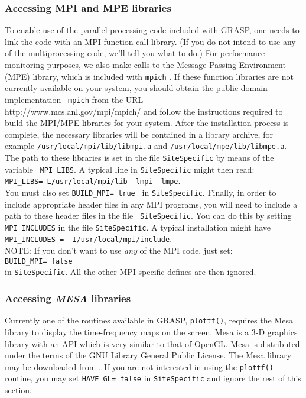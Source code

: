 \subsubsection{Accessing MPI and MPE libraries}
To enable use of the parallel processing code included with GRASP, one
needs to link the code with an MPI function call library.  (If you do not
intend to use any of the multiprocessing code, we'll tell you what to do.)
For performance monitoring purposes, we also make calls to the Message
Passing Environment (MPE) library, which is included with {\tt mpich}
\cite{MPICH}.  If these function libraries are not currently available
on your system, you should obtain the public domain implementation {\tt
mpich} from the URL\\
{http://www.mcs.anl.gov/mpi/mpich/}
and follow the instructions required
to build the MPI/MPE libraries for your system.  After the installation
process is complete, the necessary libraries will be contained in a
library archive, for example \mbox{\tt /usr/local/mpi/lib/libmpi.a} and
\mbox{\tt /usr/local/mpe/lib/libmpe.a}.  The path to these libraries
is set in the file {\tt SiteSpecific} by means of the variable {\tt
MPI\_LIBS}.  A typical line in {\tt SiteSpecific} might then read:\\
\mbox{\tt MPI\_LIBS=-L/usr/local/mpi/lib -lmpi -lmpe}.\\
You must also set {\tt BUILD\_MPI= true } in {\tt SiteSpecific}.
Finally, in order to include appropriate header files in any MPI programs,
you will need to include a path to these header files in the file {\tt
SiteSpecific}.  You can do this by setting {\tt MPI\_INCLUDES} in the
file {\tt SiteSpecific}.  A typical installation might have \\
{\tt MPI\_INCLUDES = -I/usr/local/mpi/include}.\\
NOTE: If you don't want to use {\it any} of the MPI code, just set:\\
{\tt BUILD\_MPI= false}\\ in {\tt SiteSpecific}.  All the other
MPI-specific defines are then ignored.  
 
\subsubsection{Accessing {\it MESA} libraries}
Currently one of the routines available in GRASP, {\tt plottf()},
requires the Mesa library to display the time-frequency maps on the
screen. 
Mesa is a 3-D graphics library with an 
API which is very similar to
that of OpenGL. Mesa is distributed under the terms of
the GNU Library General Public License. The Mesa library 
may be downloaded from
.
If you are not interested in using the {\tt plottf()}
routine, you may set {\tt HAVE\_GL= false} in {\tt SiteSpecific} and
ignore the rest of this section.


